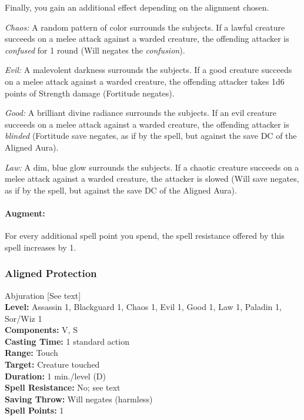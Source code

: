 Finally, you gain an additional effect depending on the alignment chosen.
\begin{list}{}{\leftmargin=1em}
 \item \emph{Chaos:} A random pattern of color surrounds the subjects.
If a lawful creature succeeds on a melee attack against a warded creature, 
the offending attacker is \emph{confused} for 1 round (Will negates the \emph{confusion}).
 \item \emph{Evil:} A malevolent darkness surrounds the subjects.
If a good creature succeeds on a melee attack against a warded creature, 
the offending attacker takes 1d6 points of Strength damage (Fortitude negates).
 \item \emph{Good:} A brilliant divine radiance surrounds the subjects. 
If an evil creature succeeds on a melee attack against a warded creature, 
the offending attacker is \emph{blinded} (Fortitude save negates, as if by the  spell, but against the save DC of the Aligned Aura).
 \item \emph{Law:} A dim, blue glow surrounds the subjects.
If a chaotic creature succeeds on a melee attack against a warded creature, 
the attacker is slowed (Will save negates, as if by the  spell, but against the save DC of the Aligned Aura).
\end{list}
\paragraph{Augment:} For every additional spell point you spend, the spell resistance offered by this spell increases by 1.
\subsubsection{Aligned Protection}
\label{Spell:AlignedProtection}
Abjuration [See text]
\\ \textbf{Level:} Assassin 1, Blackguard 1, Chaos 1, Evil 1, Good 1, Law 1, Paladin 1, Sor/Wiz 1
\\ \textbf{Components:} V, S
\\ \textbf{Casting Time:} 1 standard action
\\ \textbf{Range:} Touch
\\ \textbf{Target:} Creature touched
\\ \textbf{Duration:} 1 min./level (D)
\\ \textbf{Spell Resistance:} No; see text
\\ \textbf{Saving Throw:} Will negates (harmless)
\\ \textbf{Spell Points:} 1

